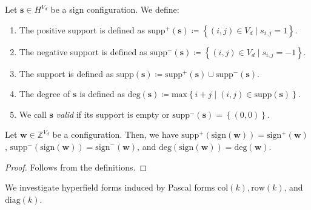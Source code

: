 \begin{definition}
    Let \( \mathbf{s} \in H^{V_d} \) be a sign configuration. We define:
    \begin{enumerate}
        \item The positive support is defined as \( \mathrm{supp}^+(\mathbf{s}) \coloneqq \left\{ (i,j) \in V_d \mid s_{i,j} = 1 \right\} \).
        \item The negative support is defined as \( \mathrm{supp}^-(\mathbf{s}) \coloneqq \left\{ (i,j) \in V_d \mid s_{i,j} = -1 \right\} \).
        \item The support is defined as \( \mathrm{supp}(\mathbf{s}) \coloneqq \mathrm{supp}^+(\mathbf{s}) \cup \mathrm{supp}^-(\mathbf{s}) \).
        \item The degree of \( \mathbf{s} \) is defined as \( \mathrm{deg}(\mathbf{s}) \coloneqq \mathrm{max}\left\{ i + j \mid (i,j) \in \mathrm{supp}(\mathbf{s}) \right\} \).
        \item We call \( \mathbf{s} \) \emph{valid} if its support is empty or \( \mathrm{supp}^-(\mathbf{s}) = \left\{ (0,0) \right\} \).
    \end{enumerate}
\end{definition}

\begin{lemma}
    Let \( \mathbf{w} \in \mathbb{Z}^{V_d} \) be a configuration. Then, we have \( \mathrm{supp}^+(\mathrm{sign}(\mathbf{w})) = \mathrm{sign}^+(\mathbf{w}) \), \( \mathrm{supp}^-(\mathrm{sign}(\mathbf{w})) = \mathrm{sign}^-(\mathbf{w}) \), and  \( \mathrm{deg}(\mathrm{sign}(\mathbf{w})) = \mathrm{deg}(\mathbf{w}) \).
\end{lemma}

\begin{proof}
    Follows from the definitions.
\end{proof}

We investigate hyperfield forms induced by Pascal forms \( \mathrm{col}(k), \mathrm{row}(k) \), and \( \mathrm{diag}(k) \).

